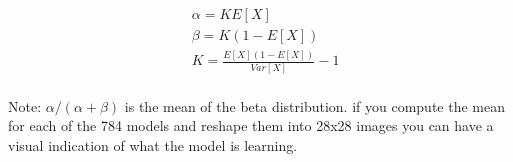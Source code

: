$$
\begin{aligned}
    & \alpha = KE[X] \\
    & \beta = K(1 - E[X]) \\
    & K = \frac{
        E[X](1 - E[X])
    }{
        Var[X]
    } - 1 \\
\end{aligned}
$$

Note: $\alpha/(\alpha + \beta)$ is the mean of the beta distribution. if you compute the mean for each of the 784 models and reshape them into 28x28 images you can have a visual indication of what the model is learning.